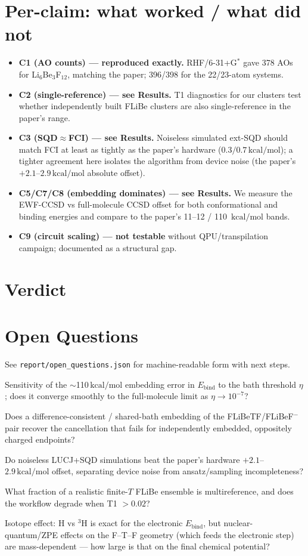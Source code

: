\documentclass[11pt]{article}
\newcommand{\kcal}{\,\mathrm{kcal/mol}}
\begin{document}
\section{Per-claim: what worked / what did not}
\begin{itemize}[nosep]
  \item \textbf{C1 (AO counts) --- reproduced exactly.} RHF/6-31+G$^*$ gave 378 AOs for
  Li$_6$Be$_3$F$_{12}$, matching the paper; 396/398 for the 22/23-atom systems.
  \item \textbf{C2 (single-reference) --- see Results.} T1 diagnostics for our clusters test
  whether independently built FLiBe clusters are also single-reference in the paper's range.
  \item \textbf{C3 (SQD$\approx$FCI) --- see Results.} Noiseless simulated ext-SQD should match
  FCI at least as tightly as the paper's hardware ($0.3/0.7\kcal$); a tighter agreement here
  isolates the algorithm from device noise (the paper's $+2.1$--$2.9\kcal$ absolute offset).
  \item \textbf{C5/C7/C8 (embedding dominates) --- see Results.} We measure the EWF-CCSD vs
  full-molecule CCSD offset for both conformational and binding energies and compare to the
  paper's 11--12 / 110 $\kcal$ bands.
  \item \textbf{C9 (circuit scaling) --- not testable} without QPU/transpilation campaign;
  documented as a structural gap.
\end{itemize}

\section{Verdict}


\section{Open Questions}
See \texttt{report/open\_questions.json} for machine-readable form with next steps.
\begin{description}[nosep]
  \item[Q1] Sensitivity of the $\sim$110$\kcal$ embedding error in $E_{\mathrm{bind}}$ to the bath threshold $\eta$; does it converge smoothly to the full-molecule limit as $\eta\to10^{-7}$?
  \item[Q2] Does a difference-consistent / shared-bath embedding of the FLiBeTF/FLiBeF$^-$ pair recover the cancellation that fails for independently embedded, oppositely charged endpoints?
  \item[Q3] Do noiseless LUCJ+SQD simulations beat the paper's hardware $+2.1$--$2.9\kcal$ offset, separating device noise from ansatz/sampling incompleteness?
  \item[Q4] What fraction of a realistic finite-$T$ FLiBe ensemble is multireference, and does the workflow degrade when T1 $>0.02$?
  \item[Q5] Isotope effect: H vs $^3$H is exact for the electronic $E_{\mathrm{bind}}$, but nuclear-quantum/ZPE effects on the F--T--F geometry (which feeds the electronic step) are mass-dependent --- how large is that on the final chemical potential?
\end{description}
\end{document}
